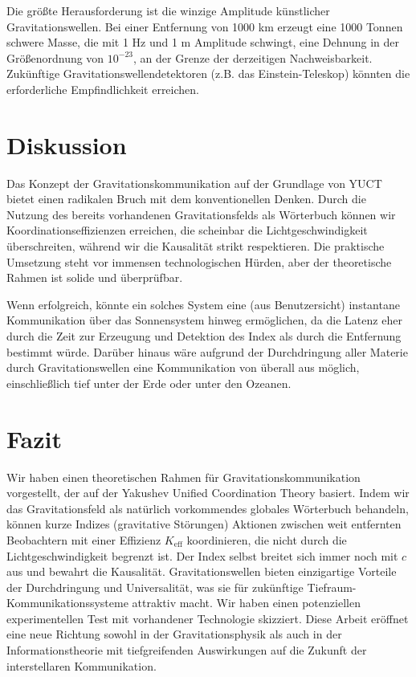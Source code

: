 \documentclass[12pt,a4paper]{article}
\newcommand{\Keff}{K_{\mathrm{eff}}}
\begin{document}
	Die größte Herausforderung ist die winzige Amplitude künstlicher Gravitationswellen. Bei einer Entfernung von 1000 km erzeugt eine 1000 Tonnen schwere Masse, die mit 1 Hz und 1 m Amplitude schwingt, eine Dehnung in der Größenordnung von \(10^{-23}\), an der Grenze der derzeitigen Nachweisbarkeit. Zukünftige Gravitationswellendetektoren (z.B. das Einstein-Teleskop) könnten die erforderliche Empfindlichkeit erreichen.
	
	\section{Diskussion}
	\label{sec:discussion}
	
	Das Konzept der Gravitationskommunikation auf der Grundlage von YUCT bietet einen radikalen Bruch mit dem konventionellen Denken. Durch die Nutzung des bereits vorhandenen Gravitationsfelds als Wörterbuch können wir Koordinationseffizienzen erreichen, die scheinbar die Lichtgeschwindigkeit überschreiten, während wir die Kausalität strikt respektieren. Die praktische Umsetzung steht vor immensen technologischen Hürden, aber der theoretische Rahmen ist solide und überprüfbar.
	
	Wenn erfolgreich, könnte ein solches System eine (aus Benutzersicht) instantane Kommunikation über das Sonnensystem hinweg ermöglichen, da die Latenz eher durch die Zeit zur Erzeugung und Detektion des Index als durch die Entfernung bestimmt würde. Darüber hinaus wäre aufgrund der Durchdringung aller Materie durch Gravitationswellen eine Kommunikation von überall aus möglich, einschließlich tief unter der Erde oder unter den Ozeanen.
	
	\section{Fazit}
	\label{sec:conclusion}
	
	Wir haben einen theoretischen Rahmen für Gravitationskommunikation vorgestellt, der auf der Yakushev Unified Coordination Theory basiert. Indem wir das Gravitationsfeld als natürlich vorkommendes globales Wörterbuch behandeln, können kurze Indizes (gravitative Störungen) Aktionen zwischen weit entfernten Beobachtern mit einer Effizienz \(\Keff\) koordinieren, die nicht durch die Lichtgeschwindigkeit begrenzt ist. Der Index selbst breitet sich immer noch mit \(c\) aus und bewahrt die Kausalität. Gravitationswellen bieten einzigartige Vorteile der Durchdringung und Universalität, was sie für zukünftige Tiefraum-Kommunikationssysteme attraktiv macht. Wir haben einen potenziellen experimentellen Test mit vorhandener Technologie skizziert. Diese Arbeit eröffnet eine neue Richtung sowohl in der Gravitationsphysik als auch in der Informationstheorie mit tiefgreifenden Auswirkungen auf die Zukunft der interstellaren Kommunikation.
	
\end{document}
